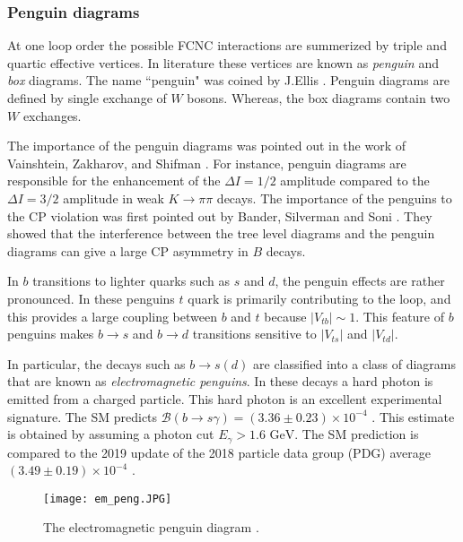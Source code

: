\subsubsection{Penguin diagrams}
At one loop order the possible FCNC interactions are summerized by triple and quartic effective vertices. In literature these vertices are known as \textit{penguin} and \textit{box} diagrams. The name ``penguin" was coined by J.Ellis \cite{Ellis:1977uk}. Penguin diagrams are defined by single exchange of $W$ bosons. Whereas, the box diagrams contain two $W$ exchanges. \par
The importance of the penguin diagrams was pointed out in the work of Vainshtein, Zakharov, and Shifman \cite{Shifman:1975tn}. For instance, penguin diagrams are responsible for the enhancement of the $\Delta I=1/2$ amplitude compared to the $\Delta I=3/2$ amplitude in weak $K\rightarrow \pi\pi$ decays. The importance of the penguins to the CP violation was first pointed out by Bander, Silverman and Soni 
\cite{Bander:1979px}. They showed that the interference between the tree level diagrams and the penguin diagrams can give a large CP asymmetry in $B$ decays.\par
In $b$ transitions to lighter quarks such as $s$ and $d$, the penguin effects are rather pronounced. In these penguins $t$ quark is primarily contributing to the loop, and this provides a large coupling between $b$ and $t$ because $|V_{tb}|\sim 1$. This feature of $b$ penguins makes $b\rightarrow s$ and $b\rightarrow d$ transitions sensitive to $|V_{ts}|$ and $|V_{td}|$. \par
In particular, the decays such as $b\rightarrow s (d)$ are classified into a class of diagrams that are known as \textit{electromagnetic penguins}. In these decays a hard photon is emitted from a charged particle. This hard photon is an excellent experimental signature. The SM predicts  $\mathcal{B}(b\rightarrow s\gamma)=(3.36\pm 0.23)\times 10^{-4}$ \cite{Misiak:2015xwa}. This estimate is obtained by assuming a photon cut $E_{\gamma}>1.6\text{ GeV}$. The SM prediction is compared to the 2019 update of the 2018 particle data group (PDG) average $(3.49\pm 0.19)\times 10^{-4}$ \cite{Tanabashi:2018oca}.
\begin{figure}[H]
\centering
\texttt{[image: em\_peng.JPG]}
\caption{\label{fig:Btosd_fcnc}
The electromagnetic penguin diagram \cite{Lingel:1998fa}.}
\end{figure}

